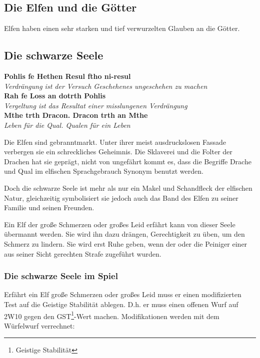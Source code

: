 \subsection{Die Elfen und die Götter}
\par Elfen haben einen sehr starken und tief verwurzelten Glauben an
die Götter.

\subsection{Die schwarze Seele}
\begin{center}
\textbf{Pohlis fe Hethen Resul ftho ni-resul}\\
\textit{Verdrängung ist der Versuch Geschehenes ungeschehen zu
machen}\\
\textbf{Rah fe Loss an dotrth Pohlis}\\
\textit{Vergeltung ist das Resultat einer misslungenen
Verdrängung}\\
\textbf{Mthe trth Dracon. Dracon trth an Mthe}\\
\textit{Leben für die Qual. Qualen für ein Leben}
\end{center}

\par Die Elfen sind gebranntmarkt. Unter ihrer meist ausdruckslosen
Fassade verbergen sie ein schreckliches Geheimnis. Die Sklaverei und
die Folter der Drachen hat sie geprägt, nicht von ungefährt kommt
es, dass die Begriffe Drache und Qual im elfischen Sprachgebrauch
Synonym benutzt werden.
\par Doch die schwarze Seele ist mehr als nur ein Makel und
Schandfleck der elfischen Natur, gleichzeitig symbolisiert sie
jedoch auch das Band des Elfen zu seiner Familie und seinen
Freunden.
\par Ein Elf der große Schmerzen oder großes Leid erfährt kann von
dieser Seele übermannt werden. Sie wird ihn dazu drängen,
Gerechtigkeit zu üben, um den Schmerz zu lindern. Sie wird erst Ruhe
geben, wenn der oder die Peiniger einer aus seiner Sicht gerechten
Strafe zugeführt wurden.

\subsubsection{Die schwarze Seele im Spiel}
\par Erfährt ein Elf große Schmerzen oder großes Leid muss er einen
modifizierten Test auf die Geistige Stabilität ablegen. D.h. er muss
einen offenen Wurf auf 2W10 gegen den GST\footnote{Geistige
Stabilität}-Wert machen. Modifikationen werden mit dem Würfelwurf
verrechnet:

